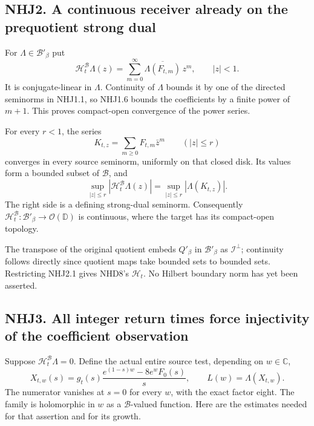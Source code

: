 \subsection{NHJ2. A continuous receiver already on the prequotient
strong
dual}\label{nhj2.-a-continuous-receiver-already-on-the-prequotient-strong-dual}

For \(\Lambda\in\mathcal B'_\beta\) put \[
\mathcal H_t^{\mathcal B}\Lambda(z)
=\sum_{m=0}^\infty\overline{\Lambda(F_{t,m})}\,z^m,
\qquad |z|<1.
\tag{NHJ2.1}
\] It is conjugate-linear in \(\Lambda\). Continuity of \(\Lambda\)
bounds it by one of the directed seminorms in NHJ1.1, so NHJ1.6 bounds
the coefficients by a finite power of \(m+1\). This proves compact-open
convergence of the power series.

For every \(r<1\), the series \[
K_{t,z}=\sum_{m\ge0}F_{t,m}\bar z^m\qquad(|z|\le r)
\tag{NHJ2.2}
\] converges in every source seminorm, uniformly on that closed disk.
Its values form a bounded subset of \(\mathcal B\), and \[
\sup_{|z|\le r}|\mathcal H_t^{\mathcal B}\Lambda(z)|
=\sup_{|z|\le r}|\Lambda(K_{t,z})|.
\tag{NHJ2.3}
\] The right side is a defining strong-dual seminorm. Consequently
\(\mathcal H_t^{\mathcal B}:\mathcal B'_\beta\to\mathcal O(\mathbb D)\)
is continuous, where the target has its compact-open topology.

The transpose of the original quotient embeds \(Q'_\beta\) in
\(\mathcal B'_\beta\) as \(\mathcal I^\perp\); continuity follows
directly since quotient maps take bounded sets to bounded sets.
Restricting NHJ2.1 gives NHD8's \(\mathcal H_t\). No Hilbert boundary
norm has yet been asserted.

\subsection{NHJ3. All integer return times force injectivity of the
coefficient
observation}\label{nhj3.-all-integer-return-times-force-injectivity-of-the-coefficient-observation}

Suppose \(\mathcal H_t^{\mathcal B}\Lambda=0\). Define the actual entire
source test, depending on \(w\in\mathbb C\), \[
X_{t,w}(s)=g_t(s)
\frac{e^{(1-s)w}-8e^wF_0(s)}s,
\qquad L(w)=\Lambda(X_{t,w}).
\tag{NHJ3.1}
\] The numerator vanishes at \(s=0\) for every \(w\), with the exact
factor eight. The family is holomorphic in \(w\) as a
\(\mathcal B\)-valued function. Here are the estimates needed for that
assertion and for its growth.

